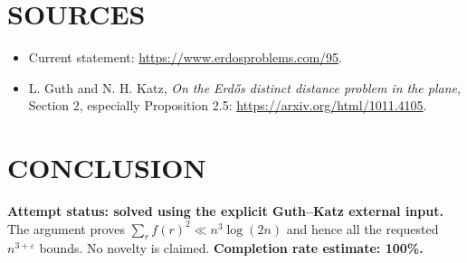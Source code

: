 \section{SOURCES}
\begin{itemize}
\item Current statement: \url{https://www.erdosproblems.com/95}.
\item L. Guth and N. H. Katz, \emph{On the Erd\H{o}s distinct distance problem in the plane}, Section 2, especially Proposition 2.5: \url{https://arxiv.org/html/1011.4105}.
\end{itemize}

\section{CONCLUSION}
\textbf{Attempt status: solved using the explicit Guth--Katz external input.} The argument proves $\sum_r f(r)^2\ll n^3\log(2n)$ and hence all the requested $n^{3+\varepsilon}$ bounds. No novelty is claimed.
\textbf{Completion rate estimate: 100\%.}
